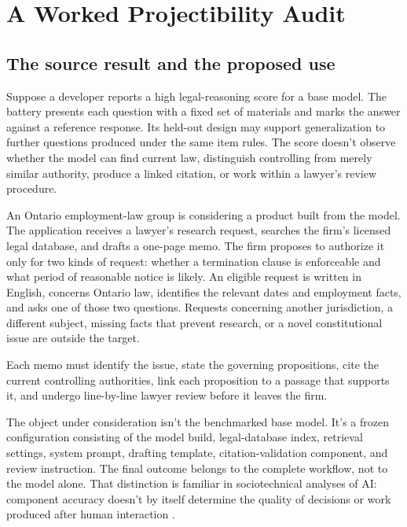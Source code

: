 \documentclass[12pt]{article}
\begin{document}
\section{A Worked Projectibility Audit}\label{sec:legal}

\subsection{The source result and the proposed use}\label{ssec:legal_setup}

Suppose a developer reports a high legal-reasoning score for a base model. The battery presents each question with a fixed set of materials and marks the answer against a reference response. Its held-out design may support generalization to further questions produced under the same item rules. The score doesn't observe whether the model can find current law, distinguish controlling from merely similar authority, produce a linked citation, or work within a lawyer's review procedure.

An Ontario employment-law group is considering a product built from the model. The application receives a lawyer's research request, searches the firm's licensed legal database, and drafts a one-page memo. The firm proposes to authorize it only for two kinds of request: whether a termination clause is enforceable and what period of reasonable notice is likely. An eligible request is written in English, concerns Ontario law, identifies the relevant dates and employment facts, and asks one of those two questions. Requests concerning another jurisdiction, a different subject, missing facts that prevent research, or a novel constitutional issue are outside the target.

Each memo must identify the issue, state the governing propositions, cite the current controlling authorities, link each proposition to a passage that supports it, and undergo line-by-line lawyer review before it leaves the firm.

The object under consideration isn't the benchmarked base model. It's a frozen configuration consisting of the model build, legal-database index, retrieval settings, system prompt, drafting template, citation-validation component, and review instruction. The final outcome belongs to the complete workflow, not to the model alone. That distinction is familiar in sociotechnical analyses of AI: component accuracy doesn't by itself determine the quality of decisions or work produced after human interaction \citep{dobbeWolters2024sociotechnical,buijsman2026accuracy,langer2025oversight}.
\end{document}
